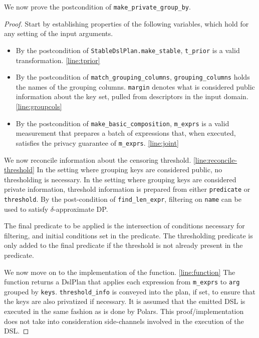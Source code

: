 \documentclass{article}
\begin{document}
We now prove the postcondition of \texttt{make\_private\_group\_by}.
\begin{proof}

Start by establishing properties of the following variables,
which hold for any setting of the input arguments.

\begin{itemize}
    \item By the postcondition of \texttt{StableDslPlan.make\_stable}, \texttt{t\_prior} is a valid transformation. \ref{line:tprior}
    \item By the postcondition of \texttt{match\_grouping\_columns}, \texttt{grouping\_columns} holds the names of the grouping columns.
        \texttt{margin} denotes what is considered public information about the key set,
        pulled from descriptors in the input domain. \ref{line:groupcols}
    \item By the postcondition of \texttt{make\_basic\_composition},
        \texttt{m\_exprs} is a valid measurement that prepares a batch of expressions that,
        when executed, satisfies the privacy guarantee of \texttt{m\_exprs}.  \ref{line:joint}
\end{itemize}

We now reconcile information about the censoring threshold. \ref{line:reconcile-threshold}
In the setting where grouping keys are considered public, no thresholding is necessary.
In the setting where grouping keys are considered private information,
threshold information is prepared from either \texttt{predicate} or \texttt{threshold}.
By the post-condition of \texttt{find\_len\_expr}, filtering on \texttt{name} can be used to satisfy
$\delta$-approximate DP.

The final predicate to be applied is the intersection of conditions necessary for filtering,
and initial conditions set in the predicate.
The thresholding predicate is only added to the final predicate
if the threshold is not already present in the predicate.

We now move on to the implementation of the function. \ref{line:function}
The function returns a DslPlan that applies each expression from \texttt{m\_exprs}
to \texttt{arg} grouped by \texttt{keys}.
\texttt{threshold\_info} is conveyed into the plan, if set,
to ensure that the keys are also privatized if necessary.
It is assumed that the emitted DSL is executed in the same fashion as is done by Polars.
This proof/implementation does not take into consideration side-channels involved in the execution of the DSL.


\end{proof}
\end{document}
